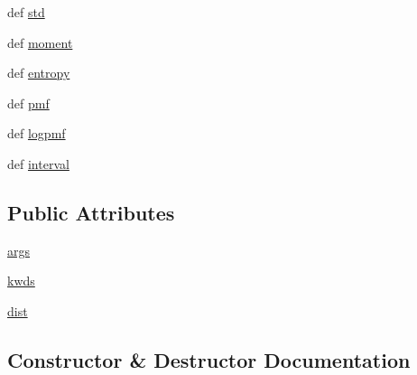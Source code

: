 \begin{DoxyCompactItemize}
def \hyperlink{classscipy_1_1stats_1_1__distn__infrastructure_1_1rv__frozen_a945b8f8498d7cf95696d24d11bceb34f}{std}
\item 
def \hyperlink{classscipy_1_1stats_1_1__distn__infrastructure_1_1rv__frozen_a63a3fc3895a53f3e2b67e767cc82c65d}{moment}
\item 
def \hyperlink{classscipy_1_1stats_1_1__distn__infrastructure_1_1rv__frozen_a254c7665d036ea18a41c6ce50921dff3}{entropy}
\item 
def \hyperlink{classscipy_1_1stats_1_1__distn__infrastructure_1_1rv__frozen_aa2da48b998ca45ca5820c2f47fa1f0dd}{pmf}
\item 
def \hyperlink{classscipy_1_1stats_1_1__distn__infrastructure_1_1rv__frozen_a6de239300f43d1dfd8ed19dcf758eef7}{logpmf}
\item 
def \hyperlink{classscipy_1_1stats_1_1__distn__infrastructure_1_1rv__frozen_a92442e6fbffcc13bcfb146209c1328d2}{interval}
\end{DoxyCompactItemize}
\subsection*{Public Attributes}
\begin{DoxyCompactItemize}
\item 
\hyperlink{classscipy_1_1stats_1_1__distn__infrastructure_1_1rv__frozen_a35ff1a62c774365a72a6a1334ce5dac5}{args}
\item 
\hyperlink{classscipy_1_1stats_1_1__distn__infrastructure_1_1rv__frozen_a3317b1bea8c9caf840f5c7954a317c20}{kwds}
\item 
\hyperlink{classscipy_1_1stats_1_1__distn__infrastructure_1_1rv__frozen_a5e66656c797ee2badca19afbd1bb5c39}{dist}
\end{DoxyCompactItemize}


\subsection{Constructor \& Destructor Documentation}
\hypertarget{classscipy_1_1stats_1_1__distn__infrastructure_1_1rv__frozen_a1cb1259dd0492ad6472cf73c44f98dbc}{}

